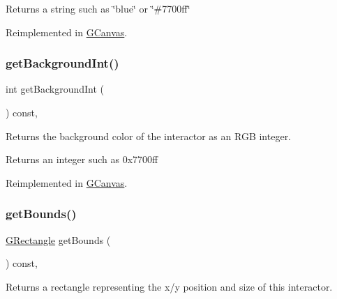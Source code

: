 \begin{DoxyReturn}{Returns}
a string such as \char`\"{}blue\char`\"{} or \char`\"{}\#7700ff\char`\"{} 
\end{DoxyReturn}


Reimplemented in \mbox{\hyperlink{classGCanvas_ab44f928b6bd7c8e4b82d5ed92bc3d4c6}{G\+Canvas}}.

\mbox{\label{classGInteractor_a9e827257a55cb8cf4d9de2ec6bcfd7a0}} 
\subsubsection{\texorpdfstring{get\+Background\+Int()}{getBackgroundInt()}}
{\footnotesize\ttfamily int get\+Background\+Int (\begin{DoxyParamCaption}{ }\end{DoxyParamCaption}) const\hspace{0.3cm}{\ttfamily [virtual]}, {\ttfamily [inherited]}}



Returns the background color of the interactor as an R\+GB integer. 

\begin{DoxyReturn}{Returns}
an integer such as 0x7700ff 
\end{DoxyReturn}


Reimplemented in \mbox{\hyperlink{classGCanvas_af66f525e8154dbc8dcd2daecf3728ba9}{G\+Canvas}}.

\mbox{\label{classGInteractor_a29e6ac35a0b48f491a4c88194cc5da3b}} 
\subsubsection{\texorpdfstring{get\+Bounds()}{getBounds()}}
{\footnotesize\ttfamily \mbox{\hyperlink{classGRectangle}{G\+Rectangle}} get\+Bounds (\begin{DoxyParamCaption}{ }\end{DoxyParamCaption}) const\hspace{0.3cm}{\ttfamily [virtual]}, {\ttfamily [inherited]}}



Returns a rectangle representing the x/y position and size of this interactor. 

